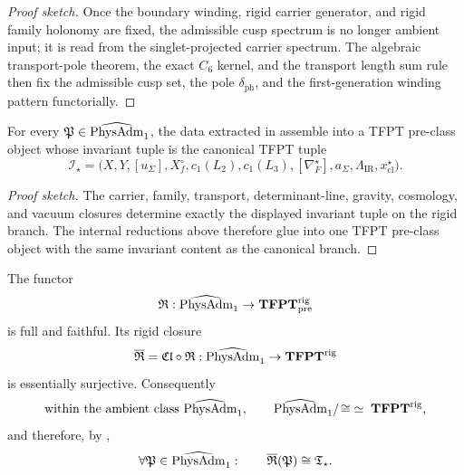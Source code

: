 \begin{proof}[Proof sketch]
Once the boundary winding, rigid carrier generator, and rigid family holonomy are fixed,
the admissible cusp spectrum is no longer ambient input; it is read from the singlet-projected
carrier spectrum. The algebraic transport-pole theorem, the exact $C_6$ kernel, and the transport
length sum rule then fix the admissible cusp set, the pole $\delta_{\mathrm{ph}}$, and the
first-generation winding pattern functorially.
\end{proof}

\begin{theorem}
\label{prop:universal-glueing}
For every $\mathfrak P\in\widehat{\mathrm{PhysAdm}}_1$, the data extracted in
assemble into a TFPT pre-class object whose invariant tuple is the canonical TFPT tuple
\[
\mathcal I_\star=
\bigl(
    X,Y,[u_\Sigma],X_f^\circ,c_1(L_2),c_1(L_3),[\nabla_F^\star],a_\Sigma,\Lambda_{\mathrm{IR}},x_{\mathrm{cl}}^\star
\bigr).
\]
\end{theorem}

\begin{proof}[Proof sketch]
The carrier, family, transport, determinant-line, gravity, cosmology, and vacuum closures
determine exactly the displayed invariant tuple on the rigid branch. The internal reductions above
therefore glue into one TFPT pre-class object with the same invariant content as the canonical
branch.
\end{proof}

\iffalse
\begin{theorem}
\label{thm:universality-tfpt}
The functor
\[
\mathfrak R:\widehat{\mathrm{PhysAdm}}_1\to \mathbf{TFPT}^{\mathrm{rig}}_{\mathrm{pre}}
\]
is full and faithful. Its rigid closure
\[
\overline{\mathfrak R}=\mathfrak{Cl}\circ \mathfrak R:\widehat{\mathrm{PhysAdm}}_1\to \mathbf{TFPT}^{\mathrm{rig}}
\]
is essentially surjective. Consequently
\[
\text{within the ambient class }\widehat{\mathrm{PhysAdm}}_1,\qquad
\widehat{\mathrm{PhysAdm}}_1/\!\cong\;\simeq\;\mathbf{TFPT}^{\mathrm{rig}},
\]
and therefore, by ,
\[
\forall \mathfrak P\in\widehat{\mathrm{PhysAdm}}_1:\qquad
\overline{\mathfrak R}(\mathfrak P)\cong \mathfrak T_{\star}.
\]
\end{theorem}

